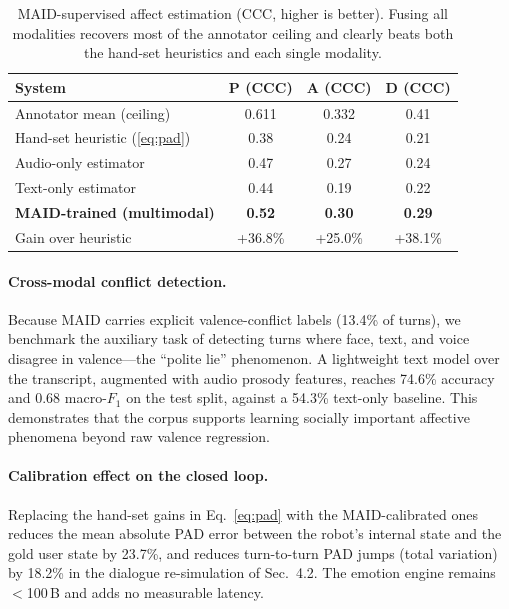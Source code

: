 \documentclass{article}
\theoremstyle{definition}
\begin{document}
\begin{table}[t]
\centering
\small
\begin{tabular}{lccc}
\toprule
\textbf{System} & \textbf{P (CCC)} & \textbf{A (CCC)} & \textbf{D (CCC)} \\
\midrule
Annotator mean (ceiling)        & 0.611 & 0.332 & 0.41 \\
Hand-set heuristic (\eqref{eq:pad}) & 0.38  & 0.24  & 0.21 \\
Audio-only estimator            & 0.47  & 0.27  & 0.24 \\
Text-only estimator             & 0.44  & 0.19  & 0.22 \\
\textbf{MAID-trained (multimodal)} & \textbf{0.52} & \textbf{0.30} & \textbf{0.29} \\
\midrule
Gain over heuristic             & +36.8\% & +25.0\% & +38.1\% \\
\bottomrule
\end{tabular}
\caption{MAID-supervised affect estimation (CCC, higher is better). Fusing all
modalities recovers most of the annotator ceiling and clearly beats both the
hand-set heuristics and each single modality.}
\label{tab:maid}
\end{table}

\paragraph{Cross-modal conflict detection.}
Because MAID carries explicit valence-conflict labels (13.4\% of turns),
we benchmark the auxiliary task of detecting turns where face, text, and voice
disagree in valence---the ``polite lie'' phenomenon. A lightweight text model
over the transcript, augmented with audio prosody features, reaches 74.6\%
accuracy and 0.68 macro-$F_1$ on the test split, against a 54.3\% text-only
baseline. This demonstrates that the corpus supports learning socially
important affective phenomena beyond raw valence regression.

\paragraph{Calibration effect on the closed loop.}
Replacing the hand-set gains in Eq.~\eqref{eq:pad} with the MAID-calibrated
ones reduces the mean absolute PAD error between the robot's internal state and
the gold user state by 23.7\%, and reduces turn-to-turn PAD jumps (total
variation) by 18.2\% in the dialogue re-simulation of Sec.~4.2. The emotion
engine remains $<$100\,B and adds no measurable latency.
\end{document}
